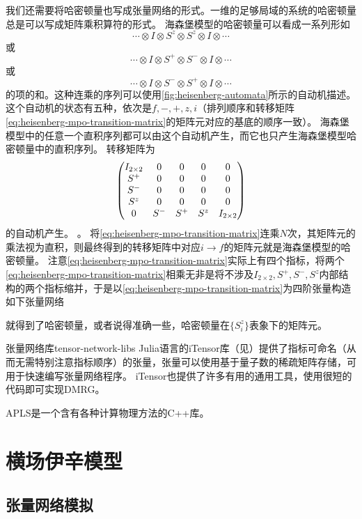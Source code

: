 我们还需要将哈密顿量也写成张量网络的形式。一维的足够局域的系统的哈密顿量总是可以写成矩阵乘积算符的形式。
海森堡模型的哈密顿量可以看成一系列形如
\[
    \cdots \otimes I \otimes S^z \otimes S^z \otimes I \otimes \cdots
\]
或
\[
    \cdots \otimes I \otimes S^+ \otimes S^- \otimes I \otimes \cdots
\]
或
\[
    \cdots \otimes I \otimes S^- \otimes S^+ \otimes I \otimes \cdots
\]
的项的和。这种连乘的序列可以使用\autoref{fig:heisenberg-automata}所示的自动机描述。
这个自动机的状态有五种，依次是$f, -, +, z, i$（排列顺序和转移矩阵\eqref{eq:heisenberg-mpo-transition-matrix}的矩阵元对应的基底的顺序一致）。
海森堡模型中的任意一个直积序列都可以由这个自动机产生，而它也只产生海森堡模型哈密顿量中的直积序列。
转移矩阵为
\begin{equation}
    \pmqty{
        I_{2 \times 2} & 0 & 0 & 0 & 0 \\
        S^+ & 0 & 0 & 0 & 0 \\
        S^- & 0 & 0 & 0 & 0 \\
        S^z & 0 & 0 & 0 & 0 \\
        0 & S^- & S^+ & S^z & I_{2 \times 2}
    }
    \label{eq:heisenberg-mpo-transition-matrix}
\end{equation}
的自动机产生。
。
将\eqref{eq:heisenberg-mpo-transition-matrix}连乘$N$次，其矩阵元的乘法视为直积，则最终得到的转移矩阵中对应$i \to f$的矩阵元就是海森堡模型的哈密顿量。
注意\eqref{eq:heisenberg-mpo-transition-matrix}实际上有四个指标，将两个\eqref{eq:heisenberg-mpo-transition-matrix}相乘无非是将不涉及$I_{2 \times 2}, S^+, S^-, S^z$内部结构的两个指标缩并，于是以\eqref{eq:heisenberg-mpo-transition-matrix}为四阶张量构造如下张量网络

就得到了哈密顿量，或者说得准确一些，哈密顿量在$\{S^z_i\}$表象下的矩阵元。

\begin{info}{张量网络库}{tensor-network-libs}
    Julia语言的iTensor库（见\cite{itensor}）提供了指标可命名（从而无需特别注意指标顺序）的张量，张量可以使用基于量子数的稀疏矩阵存储，可用于快速编写张量网络程序。
    iTensor也提供了许多有用的通用工具，使用很短的代码即可实现DMRG。
    
    APLS是一个含有各种计算物理方法的C++库。
\end{info}

\section{横场伊辛模型}

\subsection{张量网络模拟}

